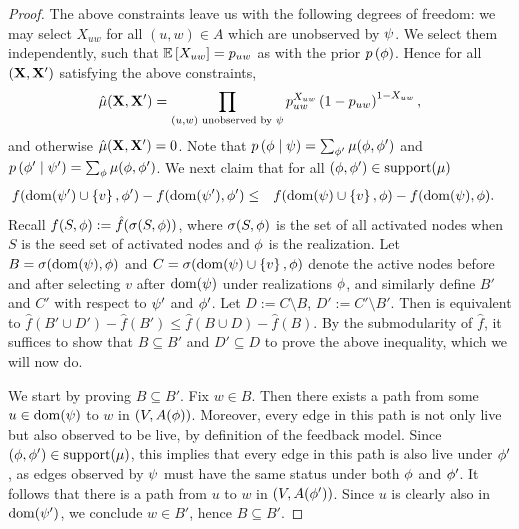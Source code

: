 \begin{proof}
The above constraints leave us with the following degrees of freedom:  
we may select $X_{uw}$ for all $(u,w) \in A$ which are unobserved by
$\prlz$.  We select them independently, such that $\expct{X_{uw}} =
p_{uw}$ as with the prior $\rlzprior$.  Hence for all $(\Xvec, \Xvec')$
satisfying the above constraints, 
$$\hat{\mu}(\Xvec, \Xvec') = \prod_{(u,w) \text{ unobserved by }\prlz}
p_{uw}^{X_{uw} } \paren{1 - p_{uw}}^{1 - X_{uw}},$$
and otherwise $\hat{\mu}(\Xvec, \Xvec') = 0$.
Note that $\rlzmass{\rlz \mid \prlz} = \sum_{\rlz'} \mu(\rlz, \rlz')$ and $\rlzmass{\rlz' \mid \prlz'} = \sum_{\rlz} \mu(\rlz, \rlz')$.
%
We next claim that for all 
$(\rlz, \rlz') \in \support(\mu)$ 
\begin{eqnarray}
  \label{eq:1vm}
f(\dom(\prlz') \cup \set{v}, \rlz') - f(\dom(\prlz'),
  \rlz')  
 & \le & f(\dom(\prlz) \cup \set{v}, \rlz) - f(\dom(\prlz),
  \rlz).\quad  
\end{eqnarray}
Recall $f(S, \rlz) := \hat{f}(\sigma(S, \rlz))$, where $\sigma(S, \rlz)$ is the set of all activated nodes 
when $S$ is the seed set of activated nodes and $\rlz$
is the realization.
Let $B = \sigma(\dom(\prlz), \rlz)$ and $C = \sigma(\dom(\prlz) \cup
\set{v}, \rlz)$ denote the active nodes before and after selecting $v$
after $\dom(\prlz)$ under realizations 
$\rlz$, and similarly define $B'$ and $C'$ with respect to $\prlz'$
and $\rlz'$.  
Let $D := C \setminus B$, $D' := C' \setminus B'$.
Then  is equivalent to $\hat{f}(B' \cup D') - \hat{f}(B') \le
\hat{f}(B \cup D) - \hat{f}(B)$.
By the submodularity of $\hat{f}$, it suffices to show that $B
\subseteq B'$ and $D' \subseteq D$ to prove the above inequality,
which we will now do.


We start by proving $B \subseteq B'$.  Fix $w \in B$.  Then there
exists a path from some $u \in \dom(\prlz)$ to $w$ in 
$(V, \alive{\rlz})$.  Moreover, every edge in this path is not only live
but also observed to be live,
by definition of the feedback model.  Since
$(\rlz, \rlz') \in \support(\mu)$, this implies that every edge 
in this path is also live under $\rlz'$, as edges observed by $\prlz$
must have the same status under both $\rlz$ and $\rlz'$.
It follows that there is
a path from $u$ to $w$ in $(V, \alive{\rlz'})$.
Since $u$ is clearly also in  $\dom(\prlz')$, we conclude $w \in B'$, 
hence $B \subseteq B'$.



\end{proof}

